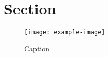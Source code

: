 \section{Section}

\begin{figure}[htb]
    \centering
    \texttt{[image: example-image]}
    \caption{Caption}
    \label{fig:label-name}
\end{figure}